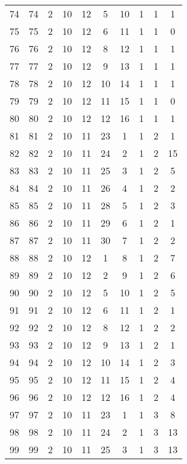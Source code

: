 \begin{longtable}{cccccccccc}
  74 &  74 &   2 &  10 &  12 &   5 &  10 &   1 &   1 &   1 \\ 
  75 &  75 &   2 &  10 &  12 &   6 &  11 &   1 &   1 &   0 \\ 
  76 &  76 &   2 &  10 &  12 &   8 &  12 &   1 &   1 &   1 \\ 
  77 &  77 &   2 &  10 &  12 &   9 &  13 &   1 &   1 &   1 \\ 
  78 &  78 &   2 &  10 &  12 &  10 &  14 &   1 &   1 &   1 \\ 
  79 &  79 &   2 &  10 &  12 &  11 &  15 &   1 &   1 &   0 \\ 
  80 &  80 &   2 &  10 &  12 &  12 &  16 &   1 &   1 &   1 \\ 
  81 &  81 &   2 &  10 &  11 &  23 &   1 &   1 &   2 &   1 \\ 
  82 &  82 &   2 &  10 &  11 &  24 &   2 &   1 &   2 &  15 \\ 
  83 &  83 &   2 &  10 &  11 &  25 &   3 &   1 &   2 &   5 \\ 
  84 &  84 &   2 &  10 &  11 &  26 &   4 &   1 &   2 &   2 \\ 
  85 &  85 &   2 &  10 &  11 &  28 &   5 &   1 &   2 &   3 \\ 
  86 &  86 &   2 &  10 &  11 &  29 &   6 &   1 &   2 &   1 \\ 
  87 &  87 &   2 &  10 &  11 &  30 &   7 &   1 &   2 &   2 \\ 
  88 &  88 &   2 &  10 &  12 &   1 &   8 &   1 &   2 &   7 \\ 
  89 &  89 &   2 &  10 &  12 &   2 &   9 &   1 &   2 &   6 \\ 
  90 &  90 &   2 &  10 &  12 &   5 &  10 &   1 &   2 &   5 \\ 
  91 &  91 &   2 &  10 &  12 &   6 &  11 &   1 &   2 &   1 \\ 
  92 &  92 &   2 &  10 &  12 &   8 &  12 &   1 &   2 &   2 \\ 
  93 &  93 &   2 &  10 &  12 &   9 &  13 &   1 &   2 &   1 \\ 
  94 &  94 &   2 &  10 &  12 &  10 &  14 &   1 &   2 &   3 \\ 
  95 &  95 &   2 &  10 &  12 &  11 &  15 &   1 &   2 &   4 \\ 
  96 &  96 &   2 &  10 &  12 &  12 &  16 &   1 &   2 &   4 \\ 
  97 &  97 &   2 &  10 &  11 &  23 &   1 &   1 &   3 &   8 \\ 
  98 &  98 &   2 &  10 &  11 &  24 &   2 &   1 &   3 &  13 \\ 
  99 &  99 &   2 &  10 &  11 &  25 &   3 &   1 &   3 &  13 \\ 

\end{longtable}
